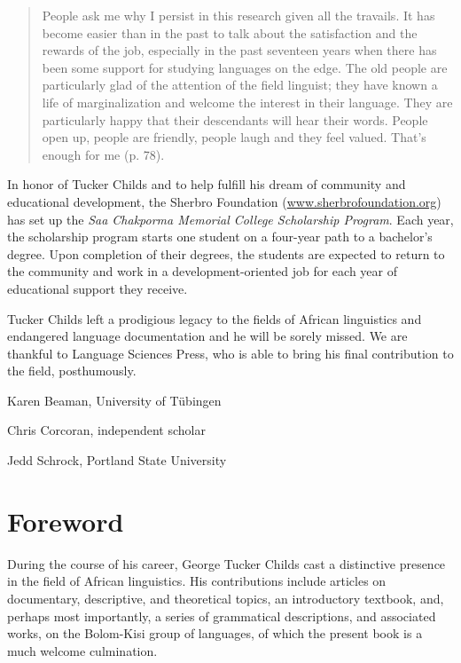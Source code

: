 \begin{quote}
 {People ask me why I persist in this research given all the travails. It has become easier than in the past to talk about the satisfaction and the rewards of the job, especially in the past seventeen years when there has been some support for studying languages on the edge. The old people are particularly glad of the attention of the field linguist; they have known a life of marginalization and welcome the interest in their language. They are particularly happy that their descendants will hear their words. People open up, people are friendly, people laugh and they feel valued. That's enough for me (p. 78).}
\end{quote}

In honor of Tucker Childs and to help fulfill his dream of community and educational development, the Sherbro Foundation (\href{http://www.sherbrofoundation.org}{{www.sherbrofoundation.org}}) has set up the \textit{Saa Chakporma Memorial College Scholarship Program}. Each year, the scholarship program starts one student on a four-year path to a bachelor's degree. Upon completion of their degrees, the students are expected to return to the community and work in a development-oriented job for each year of educational support they receive.

Tucker Childs left a prodigious legacy to the fields of African linguistics and endangered language documentation and he will be sorely missed. We are thankful to Language Sciences Press, who is able to bring his final contribution to the field, posthumously.

\hfill Karen Beaman, University of Tübingen

\hfill  Chris Corcoran, independent scholar

\hfill Jedd Schrock, Portland State University

\clearpage
\section*{Foreword}

During the course of his career, George Tucker Childs cast a distinctive presence in the field of African linguistics. His contributions include articles on documentary, descriptive, and theoretical topics, an introductory textbook, and, perhaps most importantly, a series of grammatical descriptions, and associated works, on the Bolom-Kisi group of languages, of which the present book is a much welcome culmination.

